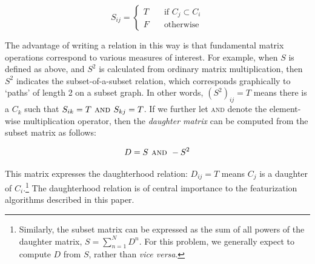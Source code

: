 \documentclass[11pt, oneside]{article}   	%
\begin{document}
$$S_{ij} = \begin{cases}
                T & \quad \text{if } C_j \subset C_i \\
                F & \quad \text{otherwise}
                \end{cases}$$

\noindent The advantage of writing a relation in this way is that fundamental matrix operations correspond to various measures of interest. For example, when $S$ is defined as above, and $S^2$ is calculated from ordinary matrix multiplication, then $S^2$ indicates the subset-of-a-subset relation, which corresponds graphically to `paths' of length 2 on a subset graph. In other words, $(S^2)_{ij} = T$ means there is a $C_k$ such that $S_{ik} = T \textsc{ and } S_{kj} = T$. If we further let \textsc{and} denote the element-wise multiplication operator, then the \textit{daughter matrix} can be computed from the subset matrix as follows: 

$$D = S \textsc{ and } -S^2$$

\noindent This matrix expresses the daughterhood relation: $D_{ij} = T$ means $C_j$ is a daughter of $C_i$.\footnote{Similarly, the subset matrix can be expressed as the sum of all powers of the daughter matrix, \mbox{$S = \sum_{n=1}^N D^n$}. For this problem, we generally expect to compute $D$ from $S$, rather than \textit{vice versa}.} The daughterhood relation is of central importance to the featurization algorithms described in this paper.



\end{document}

